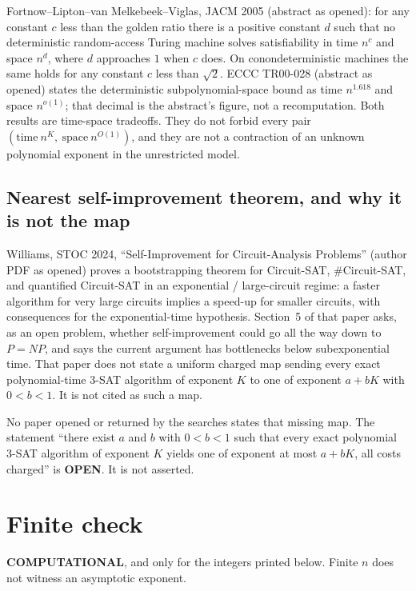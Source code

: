 \documentclass[11pt]{article}
\begin{document}
Fortnow--Lipton--van Melkebeek--Viglas, JACM 2005 (abstract as opened): for any constant $c$ less than the golden ratio there is a positive constant $d$ such that no deterministic random-access Turing machine solves satisfiability in time $n^{c}$ and space $n^{d}$, where $d$ approaches $1$ when $c$ does. On conondeterministic machines the same holds for any constant $c$ less than $\sqrt{2}$. ECCC TR00-028 (abstract as opened) states the deterministic subpolynomial-space bound as time $n^{1.618}$ and space $n^{o(1)}$; that decimal is the abstract's figure, not a recomputation. Both results are time-space tradeoffs. They do not forbid every pair $(\mathrm{time}\ n^{K},\ \mathrm{space}\ n^{O(1)})$, and they are not a contraction of an unknown polynomial exponent in the unrestricted model.

\subsection*{Nearest self-improvement theorem, and why it is not the map}
Williams, STOC 2024, ``Self-Improvement for Circuit-Analysis Problems'' (author PDF as opened) proves a bootstrapping theorem for Circuit-SAT, \#Circuit-SAT, and quantified Circuit-SAT in an exponential / large-circuit regime: a faster algorithm for very large circuits implies a speed-up for smaller circuits, with consequences for the exponential-time hypothesis. Section~5 of that paper asks, as an open problem, whether self-improvement could go all the way down to $P=NP$, and says the current argument has bottlenecks below subexponential time. That paper does not state a uniform charged map sending every exact polynomial-time 3-SAT algorithm of exponent $K$ to one of exponent $a+bK$ with $0<b<1$. It is not cited as such a map.

No paper opened or returned by the searches states that missing map. The statement ``there exist $a$ and $b$ with $0<b<1$ such that every exact polynomial 3-SAT algorithm of exponent $K$ yields one of exponent at most $a+bK$, all costs charged'' is \textbf{OPEN}. It is not asserted.

\section{Finite check}
\label{sec:finite}
\textbf{COMPUTATIONAL}, and only for the integers printed below. Finite $n$ does not witness an asymptotic exponent.
\end{document}
